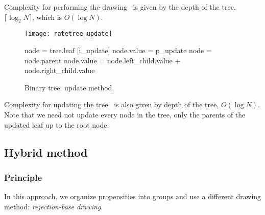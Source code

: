 Complexity for performing the drawing~ is given by the depth of the tree, $\lceil\log_2 N\rceil$, which is $O(\log N)$.

\begin{figure}[!h]
  \begin{minipage}{0.5\textwidth}
    \texttt{[image: ratetree\_update]}
  \end{minipage}
  \begin{minipage}{0.5\textwidth}
    \begin{algorithm}[H]
      \SetAlgoLined
      node = tree.leaf [i\_update]\;
      node.value = p\_update\;
            {
              node = node.parent\;
              node.value = node.left\_child.value + node.right\_child.value\;
            }
    \end{algorithm}
  \end{minipage}
  \caption{Binary tree: update method.}
  \label{fig:tree_update}
\end{figure}

Complexity for updating the tree~ is also given by depth of the tree, $O(\log N)$. Note that we need not update every node in the tree, only the parents of the updated leaf up to the root node.


\subsection {Hybrid method}

\subsubsection {Principle}

In this approach, we organize propensities into groups and use a different drawing method: \emph{rejection-base drawing}.

